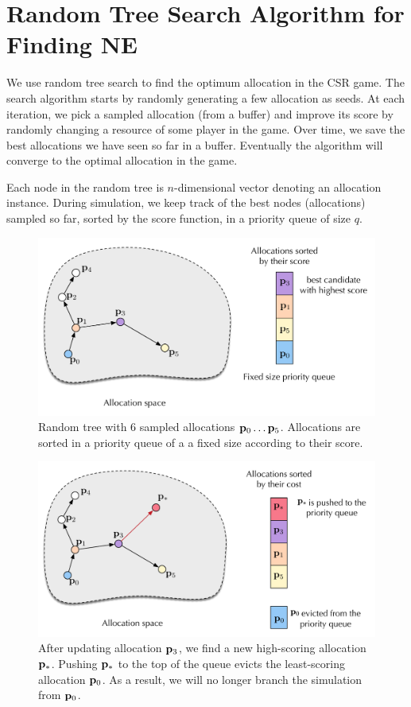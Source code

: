 \section{Random Tree Search Algorithm for Finding NE}\label{sec:apx-alg}
We use random tree search to find the optimum allocation in the CSR game. The search algorithm starts by randomly generating a few allocation as seeds. At each iteration, we pick a sampled allocation (from a buffer) and improve its score by randomly changing a resource of some player in the game.  Over time, we save the best allocations we have seen so far in a buffer. Eventually the algorithm will converge to the optimal allocation in the game.



Each node in the random tree is $n$-dimensional vector denoting an allocation instance. During simulation, we keep track of the best nodes (allocations) sampled so far, sorted by the score function, in a priority queue of size $q$.

\begin{figure}[htb]
\begin{center}
\includegraphics[width=.4\textwidth]{random-tree-figure-1}
\end{center}
\caption{Random tree with 6 sampled allocations ${\bf p}_0\dots {\bf p}_5$. Allocations are sorted in a priority queue of a a fixed size according to their score.}
\label{fig:random_tree_1}
\end{figure}

\begin{figure}[htb]
\begin{center}
\includegraphics[width=.4\textwidth]{random-tree-figure-2}
\end{center}
\caption{After updating allocation ${\bf p}_3$, we find a new high-scoring allocation ${\bf p}_*$. Pushing ${\bf p}_*$ to the top of the queue evicts the least-scoring allocation ${\bf p}_0$. As a result, we will no longer branch the simulation from ${\bf p}_0$. }
\label{fig:random_tree_2}
\end{figure}

